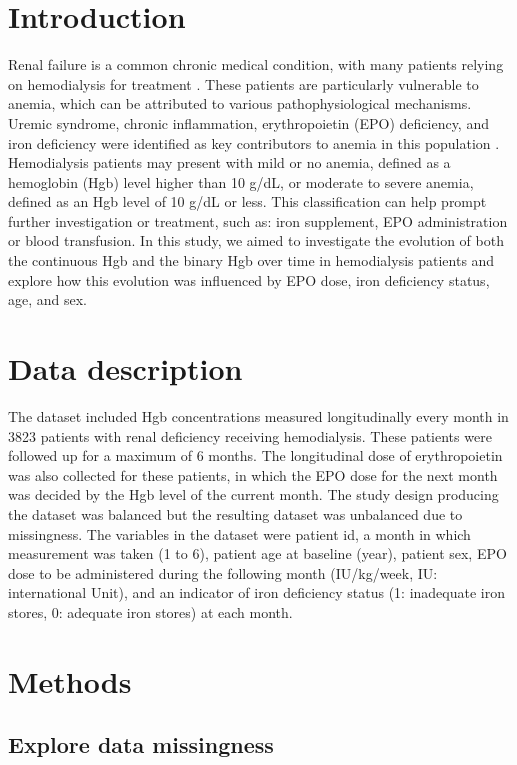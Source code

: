 \documentclass [11pt]{article}
\begin{document}
\section{Introduction}\label{introduction}
Renal failure is a common chronic medical condition, with many patients relying on hemodialysis for treatment \cite{KDIGO2024}. These patients are particularly vulnerable to anemia, which can be attributed to various pathophysiological mechanisms. Uremic syndrome, chronic inflammation, erythropoietin (EPO) deficiency, and iron deficiency were identified as key contributors to anemia in this population \cite{Portoles2021}. Hemodialysis patients may present with mild or no anemia, defined as a hemoglobin (Hgb) level higher than 10 g/dL, or moderate to severe anemia, defined as an Hgb level of 10 g/dL or less. This classification can help prompt further investigation or treatment, such as: iron supplement, EPO administration or blood transfusion. In this study, we aimed to investigate the evolution of both the continuous Hgb and the binary Hgb over time in hemodialysis patients and explore how this evolution was influenced by EPO dose, iron deficiency status, age, and sex. 

\section{Data description}\label{datadescription}

The dataset included Hgb concentrations measured longitudinally every month in 3823 patients with renal deficiency receiving hemodialysis. These patients were followed up for a maximum of 6 months. The longitudinal dose of erythropoietin was also collected for these patients, in which the EPO dose for the next month was decided by the Hgb level of the current month. The study design producing the dataset was balanced but the resulting dataset was unbalanced due to missingness. The variables in the dataset were patient id, a month in which measurement was taken (1 to 6), patient age at baseline (year), patient sex, EPO dose to be administered during the following month (IU/kg/week, IU: international Unit), and an indicator of iron deficiency status (1: inadequate iron stores, 0: adequate iron stores) at each month.

\section{Methods}\label{methods}

\subsection{Explore data missingness}  
\end{document}
